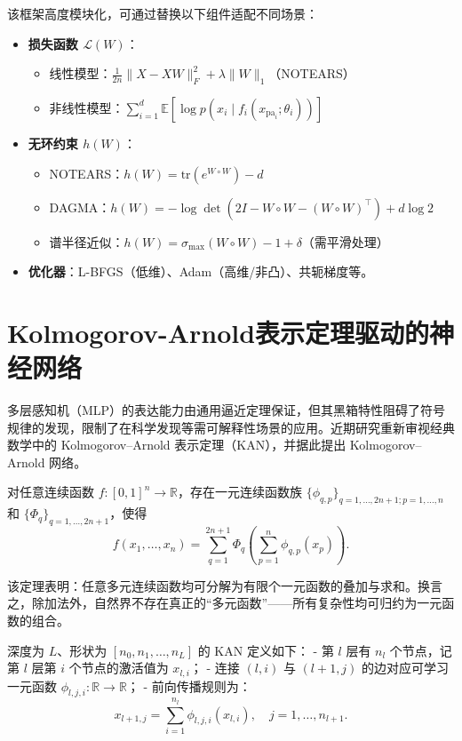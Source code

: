 该框架高度模块化，可通过替换以下组件适配不同场景：
\begin{itemize}
	\item \textbf{损失函数 $\mathcal{L}(W)$}：
	\begin{itemize}
		\item 线性模型：$\frac{1}{2n}\|X - XW\|_F^2 + \lambda \|W\|_1$（NOTEARS）
		\item 非线性模型：$\sum_{i=1}^d \mathbb{E}[\log p(x_i \mid f_i(x_{\text{pa}_i}; \theta_i))]$
	\end{itemize}
	\item \textbf{无环约束 $h(W)$}：
	\begin{itemize}
		\item NOTEARS：$h(W) = \mathrm{tr}(e^{W \circ W}) - d$
		\item DAGMA：$h(W) = -\log \det (2I - W \circ W - (W \circ W)^\top) + d \log 2$
		\item 谱半径近似：$h(W) = \sigma_{\max}(W \circ W) - 1 + \delta$（需平滑处理）
	\end{itemize}
	\item \textbf{优化器}：L-BFGS（低维）、Adam（高维/非凸）、共轭梯度等。
\end{itemize}

\section{Kolmogorov-Arnold表示定理驱动的神经网络}

多层感知机（MLP）的表达能力由通用逼近定理保证，但其黑箱特性阻碍了符号规律的发现，限制了在科学发现等需可解释性场景的应用。近期研究重新审视经典数学中的 Kolmogorov–Arnold 表示定理（KAN），并据此提出 Kolmogorov–Arnold 网络\cite{Liu2025}。

\begin{theorem}
	对任意连续函数 $f: [0,1]^n \to \mathbb{R}$，存在一元连续函数族 $\{\phi_{q,p}\}_{q=1,\dots,2n+1; p=1,\dots,n}$ 和 $\{\Phi_q\}_{q=1,\dots,2n+1}$，使得
	\begin{equation}
		f(x_1, \dots, x_n) = \sum_{q=1}^{2n+1} \Phi_q \left( \sum_{p=1}^n \phi_{q,p}(x_p) \right).
		\label{eq:ka_theorem}
	\end{equation}
\end{theorem}

该定理表明：任意多元连续函数均可分解为有限个一元函数的叠加与求和。换言之，除加法外，自然界不存在真正的“多元函数”——所有复杂性均可归约为一元函数的组合。

深度为 $L$、形状为 $[n_0, n_1, \dots, n_L]$ 的 KAN 定义如下：
- 第 $l$ 层有 $n_l$ 个节点，记第 $l$ 层第 $i$ 个节点的激活值为 $x_{l,i}$；
- 连接 $(l,i)$ 与 $(l+1,j)$ 的边对应可学习一元函数 $\phi_{l,j,i}: \mathbb{R} \to \mathbb{R}$；
- 前向传播规则为：
\begin{equation}
	x_{l+1,j} = \sum_{i=1}^{n_l} \phi_{l,j,i}(x_{l,i}), \quad j=1,\dots,n_{l+1}.
	\label{eq:kan_forward}
\end{equation}

